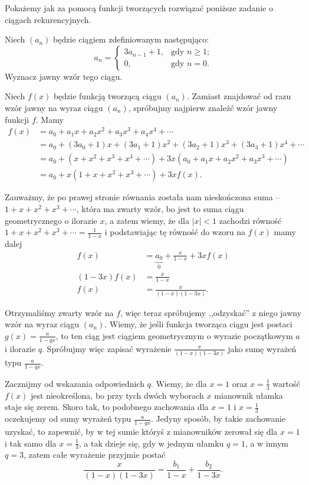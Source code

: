 \documentclass[shortabstract]{imthesis}
\begin{document}
Pokażemy jak za pomocą funkcji tworzących rozwiązać poniższe zadanie o ciągach rekurencyjnych. 
\begin{problem} \label{problem:wstep}
Niech $(a_n)$ będzie ciągiem zdefiniowanym następująco:
$$
a_n = \begin{cases} 3a_{n-1} + 1, &\text{gdy $n \geq 1$;} \\ 0, &\text{gdy $n = 0$.} \end{cases}
$$
Wyznacz jawny wzór tego ciągu.
\end{problem}
\begin{solution}
Niech $f(x)$ będzie funkcją tworzącą ciągu $(a_n)$. Zamiast znajdować od razu wzór jawny na wyraz ciągu $(a_n)$, spróbujmy najpierw znaleźć wzór jawny funkcji $f$. Mamy
\begin{align*}
    f(x) &= a_0 + a_1x + a_2x^2 + a_3x^3 + a_4x^4 + \cdots \\
    &= a_0 + (3a_0+1)x + (3a_1+1)x^2 + (3a_2+1)x^3 + (3a_3+1)x^4 + \cdots \\
    &= a_0 + (x + x^2 + x^3 + x^4 + \cdots) + 3x(a_0 + a_1x + a_2x^2 + a_3x^3 + \cdots) \\
    &= a_0 + x(1 + x + x^2 + x^3 + \cdots) + 3x f(x).
\end{align*}

Zauważmy, że po prawej stronie równania została nam nieskończona suma -- $1 + x + x^2 + x^3 + \cdots$, która ma zwarty wzór, bo jest to suma ciągu geometrycznego o ilorazie $x$, a zatem wiemy, że dla $|x| < 1$ zachodzi równość $1 + x + x^2 + x^3 + \cdots = \frac{1}{1-x}$ i podstawiając tę równość do wzoru na $f(x)$ mamy dalej
\begin{align*}
    f(x) &= \underbrace{a_0}_0 + \frac{x}{1-x} + 3x f(x) \\
    (1-3x) f(x) &= \frac{x}{1-x} \\
    f(x) &= \frac{x}{(1-x)(1-3x)}.
\end{align*}

Otrzymaliśmy zwarty wzór na $f$, więc teraz spróbujemy ,,odzyskać'' z niego jawny wzór na wyraz ciągu $(a_n)$. Wiemy, że jeśli funkcja tworząca ciągu jest postaci $g(x) = \frac{a}{1-qx}$, to ten ciąg jest ciągiem geometrycznym o wyrazie początkowym $a$ i ilorazie $q$. Spróbujmy więc zapisać wyrażenie $\frac{x}{(1-x)(1-3x)}$ jako sumę wyrażeń typu $\frac{a}{1-qx}$.

Zacznijmy od wskazania odpowiednich $q$. Wiemy, że dla $x = 1$ oraz $x = \frac13$ wartość $f(x)$ jest nieokreślona, bo przy tych dwóch wyborach $x$ mianownik ułamka staje się zerem. Skoro tak, to podobnego zachowania dla $x = 1$ i $x = \frac13$ oczekujemy od sumy wyrażeń typu $\frac{a}{1-qx}$. Jedyny sposób, by takie zachowanie uzyskać, to zapewnić, by w tej sumie któryś z mianowników zerował się dla $x = 1$ i tak samo dla $x = \frac13$, a tak dzieje się, gdy w jednym ułamku $q = 1$, a w innym $q = 3$, zatem całe wyrażenie przyjmie postać
$$
\frac{x}{(1-x)(1-3x)} = \frac{b_1}{1-x} + \frac{b_2}{1-3x}.
$$


\end{solution}
\end{document}
